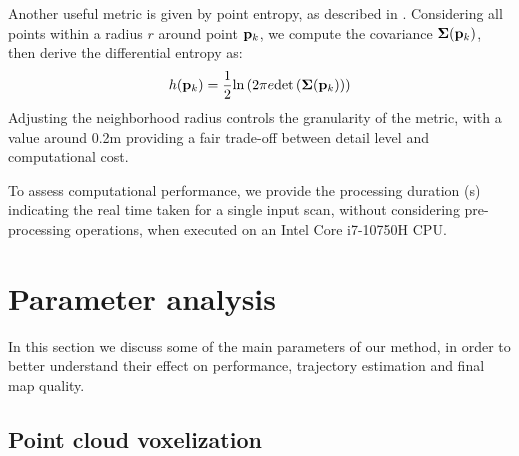\newcommand{\pk}{\vecx{p}_k}
Another useful metric is given by point entropy, as described in \cite{adolfsson2021coral}. Considering all points within a radius $r$ around point $\pk$, we compute the covariance $\matx{\Sigma}(\pk)$, then derive the differential entropy as:
\begin{equation}
    h(\pk) = \frac{1}{2}\text{ln}\left(
    2\pi e \text{det}\left(\matx{\Sigma}(\pk)\right)
    \right)
\end{equation}
Adjusting the neighborhood radius controls the granularity of the metric, with a value around 0.2m providing a fair trade-off between detail level and computational cost.

To assess computational performance, we provide the processing duration (s) indicating the real time taken for a single input scan, without considering pre-processing operations, when executed on an Intel Core i7-10750H CPU.





\section{Parameter analysis}

In this section we discuss some of the main parameters of our method, in order to better understand their effect on performance, trajectory estimation and final map quality.

\subsection{Point cloud voxelization}

